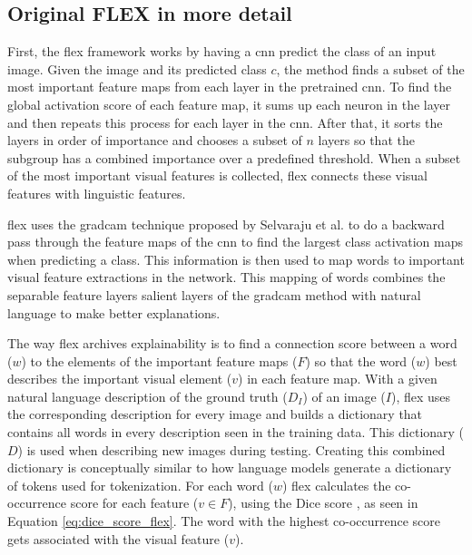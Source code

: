         \subsection{Original FLEX in more detail}
        \label{sec3:flex_detailed}
        First, the \gls{flex} framework works by having a \gls{cnn} predict the class of an input image. Given the image and its predicted class $c$, the method finds a subset of the most important feature maps from each layer in the pretrained \gls{cnn}. To find the global activation score of each feature map, it sums up each neuron in the layer and then repeats this process for each layer in the \gls{cnn}. After that, it sorts the layers in order of importance and chooses a subset of $n$ layers so that the subgroup has a combined importance over a predefined threshold. When a subset of the most important visual features is collected, \gls{flex} connects these visual features with linguistic features. 

        \gls{flex} uses the \gls{gradcam} technique proposed by Selvaraju et al. \cite{selvarajuGradCAMVisualExplanations2020} to do a backward pass through the feature maps of the \gls{cnn} to find the largest class activation maps when predicting a class. This information is then used to map words to important visual feature extractions in the network. This mapping of words combines the separable feature layers salient layers of the \gls{gradcam} method with natural language to make better explanations.
        
        The way \gls{flex} archives explainability is to find a connection score between a word ($w$) to the elements of the important feature maps ($F$) so that the word ($w$) best describes the important visual element ($v$) in each feature map. With a given natural language description of the ground truth ($D_I$) of an image ($I$), \gls{flex} uses the corresponding description for every image and builds a dictionary that contains all words in every description seen in the training data. This dictionary ($D$) is used when describing new images during testing. 
        Creating this combined dictionary is conceptually similar to how language models generate a dictionary of tokens used for tokenization.
        For each word ($w$) \gls{flex} calculates the co-occurrence score for each feature ($v \in F$), using the Dice score \cite{diceMeasuresAmountEcologic1945, sorensenMethodEstablishingGroups1948}, as seen in Equation \ref{eq:dice_score_flex}. The word with the highest co-occurrence score gets associated with the visual feature ($v$). 
        
